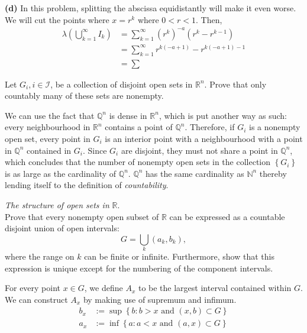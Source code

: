 \documentclass[answers]{exam}
\begin{document}
\begin{questions}
   \begin{solution}
      \textbf{(d)} In this problem, splitting the abscissa equidistantly will make it even worse. We will cut the points where $x=r^{k}$ where $0<r<1$. Then, 
      \begin{align*}
         \lambda\left(\bigcup_{k=1}^{\infty}I_{k}\right) &= \sum_{k=1}^{\infty} \left(r^{k}\right)^{-a}\left(r^{k}-r^{k-1}\right)\\
         &= \sum_{k=1}^{\infty}r^{k\left(-a+1\right)} -r^{k\left(-a+1\right)-1}\\
         &= \sum
      \end{align*}
   \end{solution}
   \question
   Let $G_{i}, i \in \mathcal{I}$, be a collection of disjoint open sets in $\mathbb{R}^{n}$. Prove that only countably many of these sets are nonempty.
   \begin{solution}
      We can use the fact that $\mathbb{Q}^{n}$ is dense in $\mathbb{R}^{n}$, which is put another way as such: every neighbourhood in $\mathbb{R}^{n}$ contains a point of $\mathbb{Q}^{n}$. Therefore, if $G_{i}$ is a nonempty open set, every point in $G_{i}$ is an interior point with a neighbourhood with a point in $\mathbb{Q}^{n}$ contained in $G_{i}$. Since $G_{i}$ are disjoint, they must not share a point in $\mathbb{Q}^{n}$, which concludes that the number of nonempty open sets in the collection $\left\{G_{i}\right\}$ is as large as the cardinality of $\mathbb{Q}^{n}$. $\mathbb{Q}^{n}$ has the same cardinality as $\mathbb{N}^{n}$ thereby lending itself to the definition of \emph{countability}. 
   \end{solution}
   \question
   \emph{The structure of open sets in} $\mathbb{R}$.\\
   Prove that every nonempty open subset of $\mathbb{R}$ can be expressed as a countable disjoint union of open intervals:
   $$
      G = \bigcup\limits_{k} \left(a_{k}, b_{k}\right),
   $$
   where the range on $k$ can be finite or infinite. Furthermore, show that this expression is unique except for the numbering of the component intervals.
   \begin{solution}
      For every point $x \in G$, we define $A_{x}$ to be the largest interval contained within $G$. We can construct $A_{x}$ by making use of supremum and infimum.
      \begin{align*}
         b_{x} &:= \sup\left\{b: b>x \text{ and } \left(x,b\right) \subset G \right\}\\
         a_{x} &:= \inf \left\{a: a < x \text{ and } \left(a, x\right) \subset G \right\}

\end{align*}
\end{solution}
\end{questions}
\end{document}
